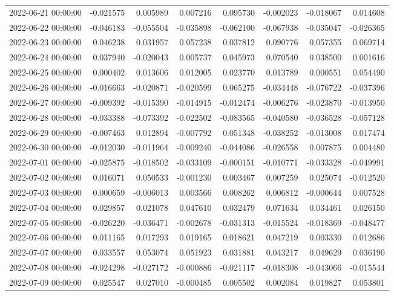 \begin{tabular}{lrrrrrrr}
2022-06-21 00:00:00 & -0.021575 & 0.005989 & 0.007216 & 0.095730 & -0.002023 & -0.018067 & 0.014608 \\
2022-06-22 00:00:00 & -0.046183 & -0.055504 & -0.035898 & -0.062100 & -0.067938 & -0.035047 & -0.026365 \\
2022-06-23 00:00:00 & 0.046238 & 0.031957 & 0.057238 & 0.037812 & 0.090776 & 0.057355 & 0.069714 \\
2022-06-24 00:00:00 & 0.037940 & -0.020043 & 0.005737 & 0.045973 & 0.070540 & 0.038500 & 0.001616 \\
2022-06-25 00:00:00 & 0.000402 & 0.013606 & 0.012005 & 0.023770 & 0.013789 & 0.000551 & 0.054490 \\
2022-06-26 00:00:00 & -0.016663 & -0.020871 & -0.020599 & 0.065275 & -0.034448 & -0.076722 & -0.037396 \\
2022-06-27 00:00:00 & -0.009392 & -0.015390 & -0.014915 & -0.012474 & -0.006276 & -0.023870 & -0.013950 \\
2022-06-28 00:00:00 & -0.033388 & -0.073392 & -0.022502 & -0.083565 & -0.040580 & -0.036528 & -0.057128 \\
2022-06-29 00:00:00 & -0.007463 & 0.012894 & -0.007792 & 0.051348 & -0.038252 & -0.013008 & 0.017474 \\
2022-06-30 00:00:00 & -0.012030 & -0.011964 & -0.009240 & -0.044086 & -0.026558 & 0.007875 & 0.004480 \\
2022-07-01 00:00:00 & -0.025875 & -0.018502 & -0.033109 & -0.000151 & -0.010771 & -0.033328 & -0.049991 \\
2022-07-02 00:00:00 & 0.016071 & 0.050533 & -0.001230 & 0.003467 & 0.007259 & 0.025074 & -0.012520 \\
2022-07-03 00:00:00 & 0.000659 & -0.006013 & 0.003566 & 0.008262 & 0.006812 & -0.000644 & 0.007528 \\
2022-07-04 00:00:00 & 0.029857 & 0.021078 & 0.047610 & 0.032479 & 0.071634 & 0.034461 & 0.026150 \\
2022-07-05 00:00:00 & -0.026220 & -0.036471 & -0.002678 & -0.031313 & -0.015524 & -0.018369 & -0.048477 \\
2022-07-06 00:00:00 & 0.011165 & 0.017293 & 0.019165 & 0.018621 & 0.047219 & 0.003330 & 0.012686 \\
2022-07-07 00:00:00 & 0.033557 & 0.053074 & 0.051923 & 0.031881 & 0.043217 & 0.049629 & 0.036190 \\
2022-07-08 00:00:00 & -0.024298 & -0.027172 & -0.000886 & -0.021117 & -0.018308 & -0.043066 & -0.015544 \\
2022-07-09 00:00:00 & 0.025547 & 0.027010 & -0.000485 & 0.005502 & 0.002084 & 0.019827 & 0.053801 \\

\end{tabular}
